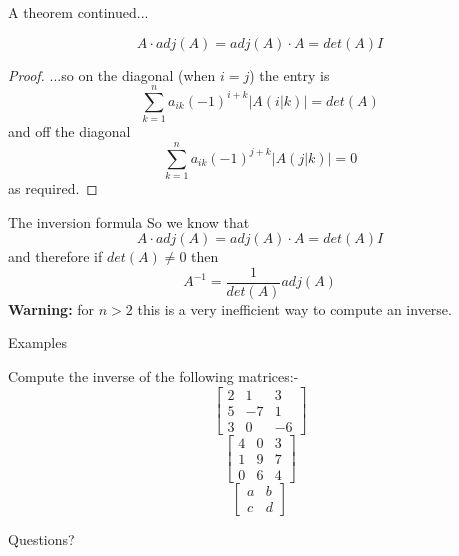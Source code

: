 \documentclass{beamer}
\begin{document}
\begin{frame}{A theorem continued...}
  \begin{theorem}
    \begin{equation*}
      A\cdot adj(A) = adj(A)\cdot A = det(A) I
    \end{equation*}
    \begin{proof}
      ...so on the diagonal (when $i=j$) the entry is
      \begin{equation*}
        \sum_{k=1}^n a_{ik}(-1)^{i+k}\left|A(i|k)\right| = det(A)
      \end{equation*}
      and off the diagonal
      \begin{equation*}
        \sum_{k=1}^n a_{ik}(-1)^{j+k}\left|A(j|k)\right| = 0
      \end{equation*}
      as required.
    \end{proof}
  \end{theorem}
\end{frame}

\begin{frame}{The inversion formula}
  So we know that
  \begin{equation*}
    A\cdot adj(A) = adj(A)\cdot A = det(A) I
  \end{equation*}\vfill
  and therefore if $det(A)\neq 0$ then
  \begin{equation*}
    A^{-1} = \frac{1}{det(A)} adj(A)
  \end{equation*}\vfill
  {\bf Warning:} for $n>2$ this is a very inefficient way to compute an inverse.
\end{frame}

\begin{frame}{Examples}
  \begin{example}
    Compute the inverse of the following matrices:-
    \begin{equation*}
      \left[
	\begin{array}{ccc}
          2&1&3\\
          5&-7&1\\
          3&0&-6
	\end{array}
      \right]
    \end{equation*}
    \begin{equation*}
      \left[
	\begin{array}{ccc}
          4&0&3\\
          1&9&7\\
          0&6&4
	\end{array}
      \right]
    \end{equation*}
    \begin{equation*}
      \left[
	\begin{array}{cc}
          a&b\\
          c&d
	\end{array}
      \right]
    \end{equation*}
  \end{example}
\end{frame}

\begin{frame}
  Questions?
\end{frame}
\end{document}

